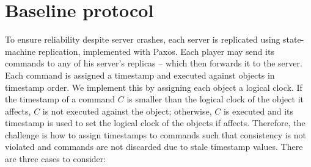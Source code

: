 \documentclass[times, 10pt]{article}
\begin{document}
\section{Baseline protocol}

To ensure reliability despite server crashes, each server is replicated using state-machine replication, implemented with Paxos. Each player may send its commands to any of his server's replicas -- which then forwards it to the server. Each command is assigned a timestamp and executed against objects in timestamp order. We implement this by assigning each object a logical clock. If the timestamp of a command $C$ is smaller than the logical clock of the object it affects, $C$ is not executed against the object; otherwise, $C$ is executed and its timestamp is used to set the logical clock of the objects if affects. Therefore, the challenge is how to assign timestamps to commands such that consistency is not violated and commands are not discarded due to stale timestamp values. There are three cases to consider:


\end{document}
